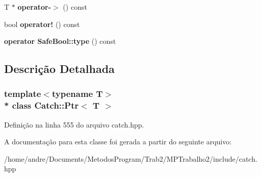 \begin{DoxyCompactItemize}
\item 
T $\ast$ {\bfseries operator-\/$>$} () const \hypertarget{classCatch_1_1Ptr_afaa13250d5e0ae5a440726d5e5aa7295}{}\label{classCatch_1_1Ptr_afaa13250d5e0ae5a440726d5e5aa7295}

\item 
bool {\bfseries operator!} () const \hypertarget{classCatch_1_1Ptr_aea1a99ded6d62423ccb9173fab91b56e}{}\label{classCatch_1_1Ptr_aea1a99ded6d62423ccb9173fab91b56e}

\item 
{\bfseries operator Safe\+Bool\+::type} () const \hypertarget{classCatch_1_1Ptr_a27234c04feec43ffe0fd08e045557448}{}\label{classCatch_1_1Ptr_a27234c04feec43ffe0fd08e045557448}

\end{DoxyCompactItemize}


\subsection{Descrição Detalhada}
\subsubsection*{template$<$typename T$>$\\*
class Catch\+::\+Ptr$<$ T $>$}



Definição na linha 555 do arquivo catch.\+hpp.



A documentação para esta classe foi gerada a partir do seguinte arquivo\+:\begin{DoxyCompactItemize}
\item 
/home/andre/\+Documents/\+Metodos\+Program/\+Trab2/\+M\+P\+Trabalho2/include/catch.\+hpp\end{DoxyCompactItemize}
